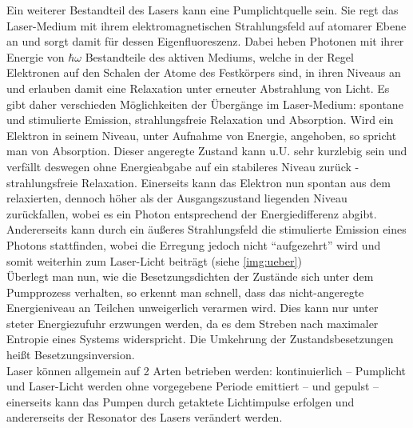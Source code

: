 \documentclass[numbers=noenddot,12pt,a4paper]{scrartcl}
\begin{document}
Ein weiterer Bestandteil des Lasers kann eine Pumplichtquelle  sein. Sie regt das Laser-Medium mit ihrem elektromagnetischen Strahlungsfeld auf atomarer Ebene an und sorgt damit für dessen Eigenfluoreszenz. Dabei heben Photonen mit ihrer Energie von $\hbar\omega$ Bestandteile des aktiven Mediums, welche in der Regel Elektronen auf den Schalen der Atome des Festkörpers sind, in ihren Niveaus an und erlauben damit eine Relaxation unter erneuter Abstrahlung von Licht. Es gibt daher verschieden Möglichkeiten der Übergänge im Laser-Medium: spontane und stimulierte Emission, strahlungsfreie Relaxation und Absorption. Wird ein Elektron in seinem Niveau, unter Aufnahme von Energie, angehoben, so spricht man von Absorption. Dieser angeregte Zustand kann u.U. sehr kurzlebig sein und verfällt deswegen ohne Energieabgabe auf ein stabileres Niveau zurück - strahlungsfreie Relaxation. Einerseits kann das Elektron nun spontan aus dem relaxierten, dennoch höher als der Ausgangszustand liegenden Niveau zurückfallen, wobei es ein Photon entsprechend der Energiedifferenz abgibt. Andererseits kann durch ein äußeres Strahlungsfeld die stimulierte Emission eines Photons stattfinden, wobei die Erregung jedoch nicht "`aufgezehrt"' wird und somit weiterhin zum Laser-Licht beiträgt (siehe \ref{img:ueber})\\
Überlegt man nun, wie die Besetzungsdichten der Zustände sich unter dem Pumpprozess verhalten, so erkennt man schnell, dass das nicht-angeregte Energieniveau an Teilchen unweigerlich verarmen wird. Dies kann nur unter steter Energiezufuhr erzwungen werden, da es dem Streben nach maximaler Entropie eines Systems widerspricht. Die Umkehrung der Zustandsbesetzungen heißt Besetzungsinversion.\\
Laser können allgemein auf 2 Arten betrieben werden: kontinuierlich -- Pumplicht und Laser-Licht werden ohne vorgegebene Periode emittiert -- und gepulst -- einerseits kann das Pumpen durch getaktete Lichtimpulse erfolgen und andererseits der Resonator des Lasers verändert werden.
\end{document}
